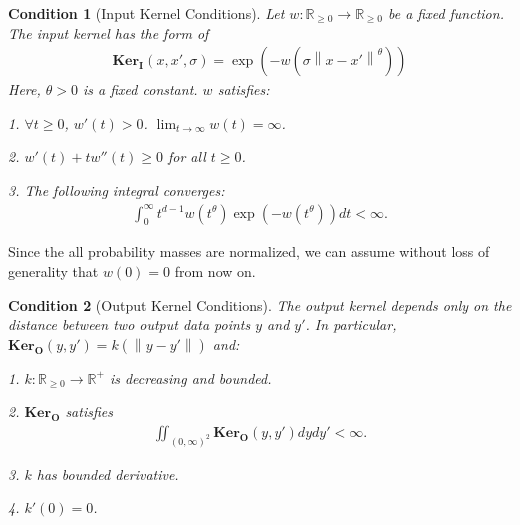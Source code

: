 \documentclass[10pt]{article}
\newcommand{\norm}[1]{\left\lVert#1\right\rVert}
\newtheorem{condition}{\bf Condition}
\newenvironment{Proof of lemma}{\noindent{\bf Proof of Lemma}}{\hfill$\Box$\newline}
\newenvironment{Proof of claim}{\noindent{\bf Proof of claim}}{\hfill$\Box$\newline}
\newenvironment{Proof of theorem}{\noindent{\bf Proof of Theorem}}{\hfill\scriptsize{$\Box$}\newline}
\newenvironment{Proof of theorems}{\noindent{\bf Proof of Theorems}}{\hfill$\Box$\newline}
\newenvironment{Proof of proposition}{\noindent{\bf Proof of Proposition}}{\hfill$\Box$\newline}
\newenvironment{Proof of propositions}{\noindent{\bf Proof of Propositions}}{\hfill$\Box$\newline}
\newenvironment{Proof of exercise}{\noindent{\it Proof of Exercise:}}{\hfill$\Box$}
\numberwithin{equation}{section}
\newcommand{\ki}{\mathbf{Ker}_{\mathbf{I}}}
\newcommand{\ko}{\mathbf{Ker}_{\mathbf{O}}}
\begin{document}
\begin{condition}[Input Kernel Conditions] \label{input_kernel_conditions}
    Let $w: \mathbb{R}_{\geq 0} \to \mathbb{R}_{\geq 0}$ be a fixed function. The input kernel has the form of
    \begin{align} \label{tsne:input_kernel}
        \ki(x,x',\sigma) = \exp(-w(\sigma\norm{x-x'}^{\theta}))
    \end{align}
    Here, $\theta>0$ is a fixed constant. $w$ satisfies:

    1. $\forall t \geq 0$, $w'(t)>0$. $\lim_{t \to \infty} w(t) = \infty$.

    2. $w'(t)+tw''(t) \geq 0$ for all $t \geq 0$.

    3. The following integral converges:
    \begin{align}
        \int_0^{\infty} t^{d-1} w(t^{\theta}) \exp(-w(t^{\theta}))dt < \infty.
    \end{align}
\end{condition}
Since the all probability masses are normalized, we can assume without loss of generality that $w(0)=0$ from now on.
\begin{condition}[Output Kernel Conditions] \label{output_kernel_conditions}
    The output kernel depends only on the distance between two output data points $y$ and $y'$. In particular, $\ko(y,y') = k (\norm{y-y'})$ and:

    1. $k: \mathbb{R}_{\geq 0} \to \mathbb{R}^+$ is decreasing and bounded.

    2. $\ko$ satisfies
    \begin{align}
        \iint_{(0,\infty)^2} \ko(y,y') dy dy' < \infty.
    \end{align}

    3. $k$ has bounded derivative.

    4. $k'(0) = 0$.
\end{condition}
\end{document}
